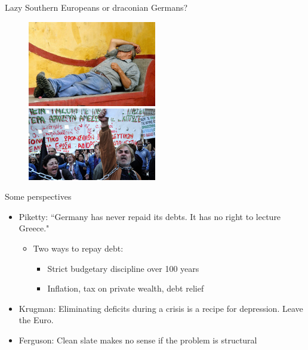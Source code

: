 \documentclass{beamer}
\begin{document}
\begin{frame}{Lazy Southern Europeans or draconian Germans?}
\begin{figure}
    \includegraphics[width=0.5\textwidth]{../img/siesta.jpg}
    \includegraphics[width=0.5\textwidth]{../img/austerity.jpg}    
\end{figure}{}
\end{frame}{}

\begin{frame}{Some perspectives}
\begin{itemize}
    \item Piketty: ``Germany has never repaid its debts. It has no right to lecture Greece."\pause
    \begin{itemize}
        \item Two ways to repay debt:
        \begin{itemize}
            \item Strict budgetary discipline over 100 years\pause
            \item Inflation, tax on private wealth, debt relief\pause
        \end{itemize}{}
    \end{itemize}{}
    \item Krugman: Eliminating deficits during a crisis is a recipe for depression. Leave the Euro.\pause
    \item Ferguson: Clean slate makes no sense if the problem is structural 
\end{itemize}{}
\end{frame}{}
\end{document}
